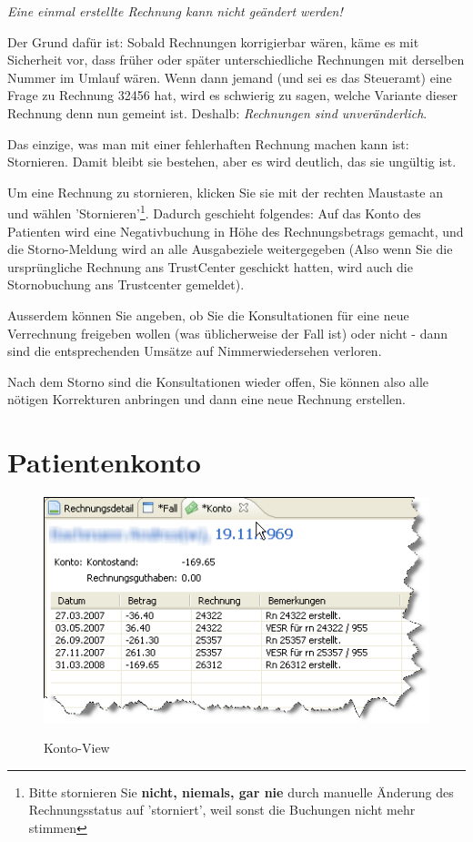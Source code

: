 \documentclass[a4paper]{scrartcl}
\begin{document}
\medskip

\textit{Eine einmal erstellte Rechnung kann nicht geändert werden!}

\medskip

Der Grund dafür ist: Sobald Rechnungen korrigierbar wären, käme es mit Sicherheit vor, dass früher oder später unterschiedliche Rechnungen mit derselben Nummer im Umlauf wären. Wenn dann jemand (und sei es das Steueramt) eine Frage zu Rechnung 32456 hat, wird es schwierig zu sagen, welche Variante dieser Rechnung denn nun gemeint ist. Deshalb: \textit{Rechnungen sind unveränderlich}.

Das einzige, was man mit einer fehlerhaften Rechnung machen kann ist: Stornieren. Damit bleibt sie bestehen, aber es wird deutlich, das sie ungültig ist.

\medskip

Um eine Rechnung zu stornieren, klicken Sie sie mit der rechten Maustaste an und wählen 'Stornieren'\footnote{Bitte stornieren Sie \textbf{nicht, niemals, gar nie} durch manuelle Änderung des Rechnungsstatus auf 'storniert', weil sonst die Buchungen nicht mehr stimmen}. Dadurch geschieht folgendes: Auf das Konto des Patienten wird eine Negativbuchung in Höhe des Rechnungsbetrags gemacht, und die Storno-Meldung wird an alle Ausgabeziele weitergegeben (Also wenn Sie die ursprüngliche Rechnung ans TrustCenter geschickt hatten, wird auch die Stornobuchung ans Trustcenter gemeldet).

Ausserdem können Sie angeben, ob Sie die Konsultationen für eine neue Verrechnung freigeben wollen (was üblicherweise der Fall ist) oder nicht - dann sind die entsprechenden Umsätze auf Nimmerwiedersehen verloren.

\medskip

Nach dem Storno sind die Konsultationen wieder offen, Sie können also alle nötigen Korrekturen anbringen und dann eine neue Rechnung erstellen.

\section{Patientenkonto}
\begin{figure}
  \includegraphics{abr23}\\
  \caption{Konto-View}\label{fig:abr23}
\end{figure}
\end{document}

